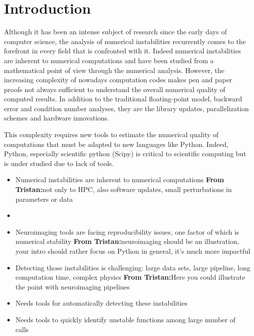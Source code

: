 \documentclass[acmconf,authordraft,anonymous,review]{acmart}
\newcommand{\tristan}[1]{\color{orange}\textbf{From Tristan:}#1\color{black}}
\begin{document}


\maketitle

\section{Introduction}

Although it has been an intense subject of research since the early days of computer science, the analysis of numerical instabilities recurrently comes to the forefront in every field that is confronted with it.
Indeed numerical instabilities are inherent to numerical computations and have been studied from a mathematical
point of view through the numerical analysis. However, the increasing complexity 
of nowadays computation codes makes pen and paper proofs not always sufficient to understand the overall 
numerical quality of computed results. In addition to the traditional floating-point model, backward error and 
condition number analyses, they are the library updates, parallelization schemes and hardware innovations.

This complexity requires new tools to estimate the numerical quality of computations that
must be adapted to new languages like Python. Indeed, Python, especially 
scientific python (Scipy) is critical to scientific computing but 
is under studied due to lack of tools.  

\begin{itemize}
    \item Numerical instabilities are inherent to numerical computations \tristan{not only to HPC, also software updates, small perturbations in parameters or data}
    \item 
    \item Neuroimaging tools are facing reproducibility issues, one factor of which is numerical stability \tristan{neuroimaging should be an illustration, your intro should rather focus on Python in general, it's much more impactful} 
    \item Detecting those instabilities is challenging: large data sets, large pipeline, long computation time, complex physics \tristan{Here you could illustrate the point with neuroimaging pipelines}
    \item Needs tools for automatically detecting these instabilities
    \item Needs tools to quickly identify unstable functions among large number of calls
\end{itemize}
\end{document}
